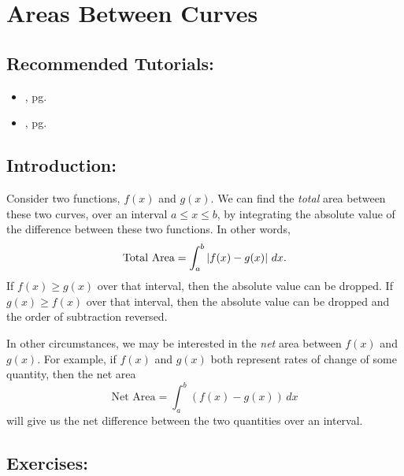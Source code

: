 \section{Areas Between Curves}
\label{sec:area_problem}

\subsection*{Recommended Tutorials:}
\begin{itemize}[noitemsep]
	\item {}, pg. \pageref{chp:equation_solvers}
	\item {}, pg. \pageref{chp:definite_and_indefinite_Integrals}
\end{itemize}

\subsection*{Introduction:}

Consider two functions, $f(x)$ and $g(x)$. We can find the \textit{total} area between these two curves, over an interval $a \le x \le b$, by integrating the absolute value of the difference between these two functions. In other words, 
\[ \text{Total Area} = \displaystyle\int_a^b \left|f(x)-g(x)\right|\,dx. \]
If $f(x) \ge g(x)$ over that interval, then the absolute value can be dropped. If $g(x) \ge f(x)$ over that interval, then the absolute value can be dropped and the order of subtraction reversed.


In other circumstances, we may be interested in the \textit{net} area between $f(x)$ and $g(x)$. For example, if $f(x)$ and $g(x)$ both represent rates of change of some quantity, then the net area 
\[ \text{Net Area} = \displaystyle\int_a^b \left(f(x)-g(x)\right)\,dx \]
will give us the net difference between the two quantities over an interval.

\subsection*{Exercises:}

